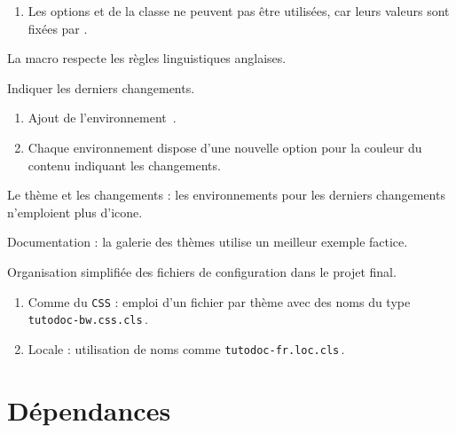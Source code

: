 {\begin{tdocnew}
\begin{enumerate}
		\item Les options  et  de la classe  ne peuvent pas être utilisées, car leurs valeurs sont fixées par \thisproj.
	\end{enumerate}

	\item La macro  respecte les règles linguistiques anglaises.

	\item Indiquer les derniers changements.
	\begin{enumerate}
		\item Ajout de l'environnement \,.

		\item Chaque environnement dispose d'une nouvelle option  pour la couleur du contenu indiquant les changements.
	\end{enumerate}
\end{tdocnew}


\begin{tdocupdate}
	\item Le thème  et les changements : les environnements pour les derniers changements n'emploient plus d'icone.

	\item Documentation : la galerie des thèmes utilise un meilleur exemple factice.
\end{tdocupdate}



\begin{tdoctech}
	\item Organisation simplifiée des fichiers de configuration dans le projet final.
	\begin{enumerate}
		\item Comme du \texttt{CSS} : emploi d'un fichier par thème avec des noms du type \texttt{tutodoc-bw.css.cls}\,.


		\item Locale : utilisation de noms comme \texttt{tutodoc-fr.loc.cls}\,.
	\end{enumerate}
\end{tdoctech}
}


\newpage
\tableofcontents
\newpage


\section{Dépendances}


